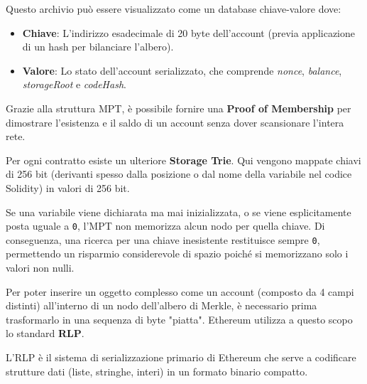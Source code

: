 Questo archivio può essere visualizzato come un database chiave-valore dove:
\begin{itemize}
    \item \textbf{Chiave}: L'indirizzo esadecimale di 20 byte dell'account (previa applicazione di un hash per bilanciare l'albero).
    \item \textbf{Valore}: Lo stato dell'account serializzato, che comprende \textit{nonce}, \textit{balance}, \textit{storageRoot} e \textit{codeHash}.
\end{itemize}

Grazie alla struttura MPT, è possibile fornire una \textbf{Proof of Membership} per dimostrare l'esistenza e il saldo di un account senza dover scansionare l'intera rete.

Per ogni contratto esiste un ulteriore \textbf{Storage Trie}. Qui vengono mappate chiavi di 256 bit (derivanti spesso dalla posizione o dal nome della variabile nel codice Solidity) in valori di 256 bit. 

Se una variabile viene dichiarata ma mai inizializzata, o se viene esplicitamente posta uguale a \texttt{0}, l'MPT non memorizza alcun nodo per quella chiave. 
Di conseguenza, una ricerca per una chiave inesistente restituisce sempre \texttt{0}, permettendo un risparmio considerevole di spazio poiché si memorizzano solo i valori non nulli.

Per poter inserire un oggetto complesso come un account (composto da 4 campi distinti) all'interno di un nodo dell'albero di Merkle, è necessario prima trasformarlo in una sequenza di byte "piatta". Ethereum utilizza a questo scopo lo standard \textbf{RLP}.

L'RLP è il sistema di serializzazione primario di Ethereum che serve a codificare strutture dati (liste, stringhe, interi) in un formato binario compatto.

